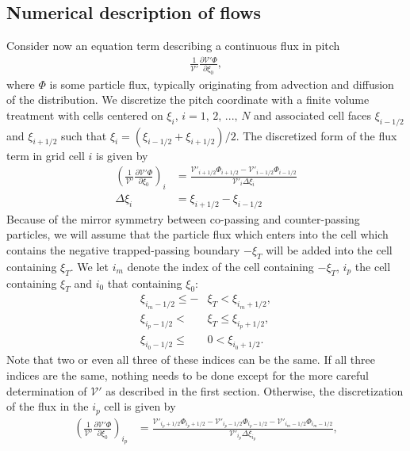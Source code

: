 \documentclass[11pt,a4paper]{article}
\newcommand{\Vp}{\ensuremath{\mathcal{V}'} }
\begin{document}
\subsection*{Numerical description of flows}
Consider now an equation term describing a continuous flux in pitch
\begin{align}
\frac{1}{\mathcal{V}'}\frac{\partial \mathcal{V}' \Phi}{\partial \xi_0} ,
\end{align}
where $\Phi$ is some particle flux, typically originating from advection and diffusion of the distribution. We discretize the pitch coordinate with a finite volume treatment with cells centered on $\xi_i$, $i=1,\,2,\,...,\,N$ and associated cell faces $\xi_{i-1/2}$ and $\xi_{i+1/2}$ such that $\xi_i = (\xi_{i-1/2} + \xi_{i+1/2})/2$. The discretized form of the flux term in grid cell $i$ is given by
\begin{align}
\left(\frac{1}{\mathcal{V}'}\frac{\partial \mathcal{V}' \Phi}{\partial \xi_0} \right)_i 
	&= \frac{\mathcal{V}'_{i+1/2}\Phi_{i+1/2} - \mathcal{V}'_{i-1/2}\Phi_{i-1/2}}{\mathcal{V}'_i \Delta \xi_i} \\
\Delta \xi_i &= \xi_{i+1/2}-\xi_{i-1/2}
\end{align}
Because of the mirror symmetry between co-passing and counter-passing particles, we will assume that the particle flux which enters into the cell which contains the negative trapped-passing boundary $-\xi_T$ will be added into the cell containing $\xi_T$. We let $i_m$ denote the index of the cell containing $-\xi_T$, $i_p$ the cell containing $\xi_T$ and $i_0$ that containing $\xi_0$:
\begin{align}
\xi_{i_m-1/2} \leq -&\xi_T < \xi_{i_m+1/2}, \nonumber \\
\xi_{i_p-1/2} < {} & \xi_T \leq \xi_{i_p+1/2}, \nonumber \\
\xi_{i_0-1/2} \leq{} &0 < \xi_{i_0+1/2}.
\end{align}
Note that two or even all three of these indices can be the same. If all three indices are the same, nothing needs to be done except for the more careful determination of \Vp\! as described in the first section. Otherwise, the discretization of the flux in the $i_p$ cell is given by
\begin{align}
\left(\frac{1}{\mathcal{V}'}\frac{\partial \mathcal{V}' \Phi}{\partial \xi_0} \right)_{i_p} &=  \frac{\mathcal{V}'_{i_p+1/2}\Phi_{i_p+1/2} - \mathcal{V}'_{i_p-1/2}\Phi_{i_p-1/2} - \mathcal{V}'_{i_m-1/2}\Phi_{i_m-1/2}}{\mathcal{V}'_{i_p} \Delta \xi_{i_p}}, %
\end{align}
\end{document}
